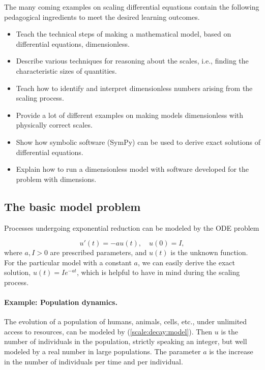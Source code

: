 \documentclass[graybox,envcountchap,sectrefs,final]{svmonodo}
\begin{document}
The many coming examples on scaling differential equations contain
the following pedagogical ingredients to meet the desired learning outcomes.

\begin{itemize}
 \item Teach the technical steps of making a mathematical model, based
   on differential equations, dimensionless.

 \item Describe various techniques for reasoning about the scales, i.e.,
   finding the characteristic sizes of quantities.

 \item Teach how to identify and interpret dimensionless numbers arising
   from the scaling process.

 \item Provide a lot of different examples on making models dimensionless
   with physically correct scales.

 \item Show how symbolic software (SymPy) can be used
   to derive exact solutions of differential equations.

 \item Explain how to run a dimensionless model with software developed
   for the problem with dimensions.
\end{itemize}

\noindent
\subsection{The basic model problem}

Processes undergoing exponential reduction can be modeled by the ODE
problem

\begin{equation}
u'(t) = -au(t),\quad u(0)=I,
\label{scale:decay:model}
\end{equation}
where $a,I>0$ are prescribed parameters, and $u(t)$ is the unknown function.
For the particular model with a constant $a$, we can easily derive the exact
solution, $u(t)=Ie^{-at}$,
which is helpful to have in mind during the scaling process.

\paragraph{Example: Population dynamics.}
The evolution of a population of humans, animals, cells, etc.,
under unlimited access to resources, can be
modeled by (\ref{scale:decay:model}). Then $u$ is the number of
individuals in the population, strictly speaking an integer, but well
modeled by a real number in large populations.
The parameter $a$ is the increase in the number of individuals per
time and per individual.
\end{document}
